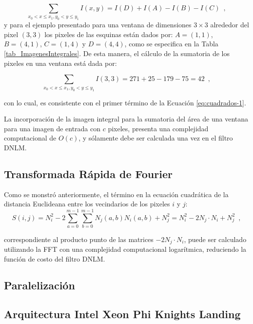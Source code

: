 \begin{equation}
\sum_{x_{0}<x\leq x_{1},y_{0}<y\leq y_{1}}I\left(x,y\right)=I\left(D\right)+I\left(A\right)-I\left(B\right)-I\left(C\right) \enspace ,
\end{equation}
y para el ejemplo presentado para una ventana de dimensiones $3\times3$ alrededor del pixel $(3,3)$ los pixeles de las esquinas est\'an dados por: $A=\left(1,1\right)$, $B=\left(4,1\right)$,
$C=\left(1,4\right)$ y $D=\left(4,4\right)$, como se especifica en la Tabla \ref{tab_ImagenesIntegrales}. De esta manera, el c\'alculo de la sumatoria de los pixeles en una ventana est\'a dada por: 

\begin{equation}
\sum_{x_{0}<x\leq x_{1},y_{0}<y\leq y_{1}}I\left(3,3\right)=271+25-179-75=42 \enspace ,
\end{equation}

con lo cual, es consistente con el primer t\'ermino de la Ecuaci\'on \ref{eq:cuadrados-1}. 

La incorporaci\'on de la imagen integral para la sumatoria del \'area de una ventana para una imagen de entrada con $c$ pixeles, presenta una complejidad computacional de $O(c)$, y s\'olamente debe ser calculada una vez en el filtro DNLM.


\subsection{Transformada R\'apida de Fourier}

Como se monstr\'o anteriormente, el t\'ermino en la ecuaci\'on cuadr\'atica de la distancia Euclideana entre los vecindarios de los pixeles $i$ y $j$:
\begin{equation}
S\left(i,j\right)=N_{i}^{2}-2\sum_{a=0}^{m-1}\sum_{b=0}^{m-1}N_{j}\left(a,b\right)N_{i}\left(a,b\right)+N_{j}^{2} =N_{i}^{2}-2N_{j}\cdot N_{i}+N_{j}^{2} \enspace , 
\end{equation}



correspondiente al producto punto de las matrices $-2N_{j}\cdot N_{i}$,  puede ser calculado utilizando la FFT con una complejidad computacional logar\'itmica, reduciendo la funci\'on de costo del filtro DNLM. 

\subsection{Paralelizaci\'on}

\subsection{Arquitectura Intel Xeon Phi Knights Landing}